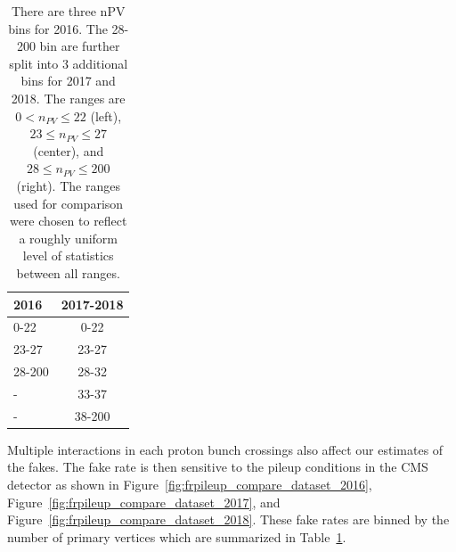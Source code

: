 \begin{table}[!htbp]
       \caption{ There are three nPV bins for 2016. The 28-200 bin are further split into 3 additional bins for 2017 and 2018. The ranges are $0 < n_{PV} \leq 22$ (left), $23 \leq n_{PV} \leq 27$ (center), and $28 \leq n_{PV} \leq 200$ (right). The ranges used for comparison were chosen to reflect a roughly uniform level of statistics between all ranges.}
       \centering
       \vspace{\baselineskip}
       \begin{tabular}{lc}
       \hline \hline
       2016 & 2017-2018\\
       \hline

       0-22 &  0-22 \\
       23-27 & 23-27 \\
       28-200 & 28-32 \\
       - & 33-37 \\
       - & 38-200\\

       \hline \hline
       \end{tabular}
       \label{table:nPV_bins}
\end{table}


Multiple interactions in each proton bunch crossings also affect our estimates of the fakes. The fake rate is then sensitive to the pileup conditions in the CMS detector as shown in Figure~\ref{fig:frpileup_compare_dataset_2016}, Figure~\ref{fig:frpileup_compare_dataset_2017}, and Figure~\ref{fig:frpileup_compare_dataset_2018}. These fake rates are binned by the number of primary vertices which are summarized in Table~\ref{table:nPV_bins}.

